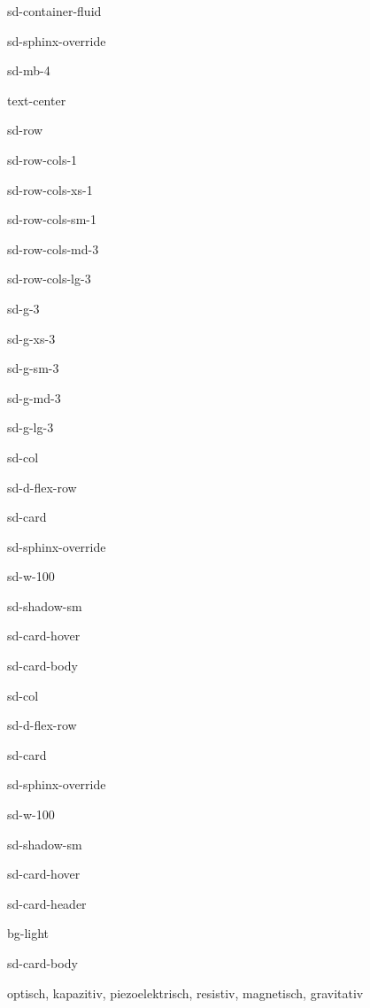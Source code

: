 \documentclass[letterpaper,10pt,english]{jupyterBook}
\let\sphinxpxdimen\pdfpxdimen\else\newdimen\sphinxpxdimen
\begin{document}
\begin{sphinxuseclass}{sd-container-fluid}
\begin{sphinxuseclass}{sd-sphinx-override}
\begin{sphinxuseclass}{sd-mb-4}
\begin{sphinxuseclass}{text-center}
\begin{sphinxuseclass}{sd-row}
\begin{sphinxuseclass}{sd-row-cols-1}
\begin{sphinxuseclass}{sd-row-cols-xs-1}
\begin{sphinxuseclass}{sd-row-cols-sm-1}
\begin{sphinxuseclass}{sd-row-cols-md-3}
\begin{sphinxuseclass}{sd-row-cols-lg-3}
\begin{sphinxuseclass}{sd-g-3}
\begin{sphinxuseclass}{sd-g-xs-3}
\begin{sphinxuseclass}{sd-g-sm-3}
\begin{sphinxuseclass}{sd-g-md-3}
\begin{sphinxuseclass}{sd-g-lg-3}
\begin{sphinxuseclass}{sd-col}
\begin{sphinxuseclass}{sd-d-flex-row}
\begin{sphinxuseclass}{sd-card}
\begin{sphinxuseclass}{sd-sphinx-override}
\begin{sphinxuseclass}{sd-w-100}
\begin{sphinxuseclass}{sd-shadow-sm}
\begin{sphinxuseclass}{sd-card-hover}
\begin{sphinxuseclass}{sd-card-body}
\end{sphinxuseclass}{\hyperref[\detokenize{content/4_ElektrischeGroessen::doc}]{}}
\end{sphinxuseclass}
\end{sphinxuseclass}
\end{sphinxuseclass}
\end{sphinxuseclass}
\end{sphinxuseclass}
\end{sphinxuseclass}
\end{sphinxuseclass}
\begin{sphinxuseclass}{sd-col}
\begin{sphinxuseclass}{sd-d-flex-row}
\begin{sphinxuseclass}{sd-card}
\begin{sphinxuseclass}{sd-sphinx-override}
\begin{sphinxuseclass}{sd-w-100}
\begin{sphinxuseclass}{sd-shadow-sm}
\begin{sphinxuseclass}{sd-card-hover}
\begin{sphinxuseclass}{sd-card-header}
\begin{sphinxuseclass}{bg-light}
\sphinxAtStartPar
{}

\end{sphinxuseclass}
\end{sphinxuseclass}
\begin{sphinxuseclass}{sd-card-body}
\noindent\sphinxincludegraphics[height=120\sphinxpxdimen]{{ifo}.png}

\sphinxAtStartPar
optisch, kapazitiv, piezo\sphinxhyphen{}elektrisch, resistiv, magnetisch, gravitativ


\end{sphinxuseclass}
\end{sphinxuseclass}
\end{sphinxuseclass}
\end{sphinxuseclass}
\end{sphinxuseclass}
\end{sphinxuseclass}
\end{sphinxuseclass}
\end{sphinxuseclass}
\end{sphinxuseclass}
\end{sphinxuseclass}
\end{sphinxuseclass}
\end{sphinxuseclass}
\end{sphinxuseclass}
\end{sphinxuseclass}
\end{sphinxuseclass}
\end{sphinxuseclass}
\end{sphinxuseclass}
\end{sphinxuseclass}
\end{sphinxuseclass}
\end{sphinxuseclass}
\end{sphinxuseclass}
\end{sphinxuseclass}
\end{sphinxuseclass}
\end{document}
